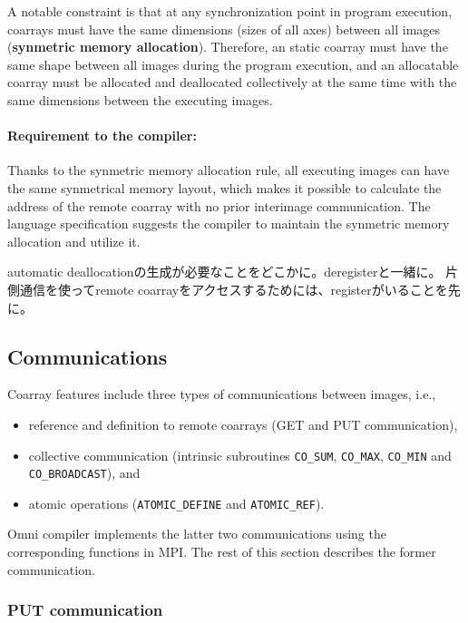 A notable constraint is that at any synchronization point in program execution, 
coarrays must have the same dimensions (sizes of all axes) between all images
({\bf synmetric memory allocation}). 
Therefore, an static coarray must have the same shape between all images during 
the program execution, and an allocatable coarray must be allocated and deallocated 
collectively at the same time with the same dimensions between the executing images.

\paragraph{Requirement to the compiler:}
Thanks to the synmetric memory allocation rule, all executing images can have
the same synmetrical memory layout, which makes it possible to calculate the address 
of the remote coarray with no prior interimage communication.
The language specification suggests the compiler to maintain the synmetric memory
allocation and utilize it.

automatic deallocationの生成が必要なことをどこかに。deregisterと一緒に。
片側通信を使ってremote coarrayをアクセスするためには、registerがいることを先に。


\subsection{Communications}

Coarray features include three types of communications between images, i.e.,
\begin{itemize}
\item reference and definition to remote coarrays (GET and PUT communication),
\item collective communication (intrinsic subroutines {\tt CO\_SUM}, {\tt CO\_MAX}, 
{\tt CO\_MIN} and {\tt CO\_BROADCAST}), and
\item atomic operations ({\tt ATOMIC\_DEFINE} and {\tt ATOMIC\_REF}).
\end{itemize}

Omni compiler implements the latter two communications using the corresponding 
functions in MPI. The rest of this section describes the former communication.

\subsubsection{PUT communication}

